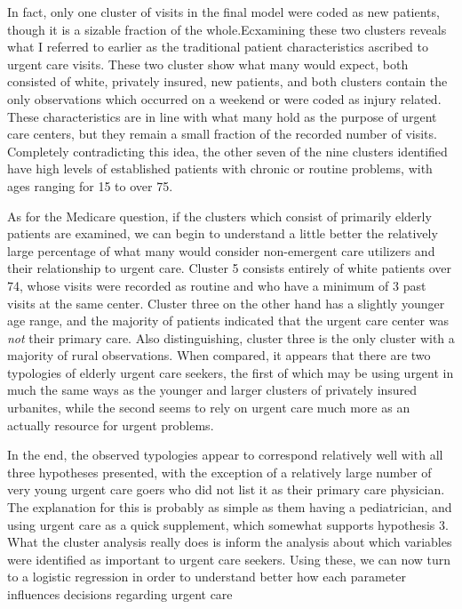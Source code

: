 \documentclass[12pt,twoside]{reedthesis}
\begin{document}
  In fact, only one cluster of visits in the final model were coded as new
  patients, though it is a sizable fraction of the whole.Ecxamining these
  two clusters reveals what I referred to earlier as the traditional
  patient characteristics ascribed to urgent care visits. These two
  cluster show what many would expect, both consisted of white, privately
  insured, new patients, and both clusters contain the only observations
  which occurred on a weekend or were coded as injury related. These
  characteristics are in line with what many hold as the purpose of urgent
  care centers, but they remain a small fraction of the recorded number of
  visits. Completely contradicting this idea, the other seven of the nine
  clusters identified have high levels of established patients with
  chronic or routine problems, with ages ranging for 15 to over 75.
  
  As for the Medicare question, if the clusters which consist of primarily
  elderly patients are examined, we can begin to understand a little
  better the relatively large percentage of what many would consider
  non-emergent care utilizers and their relationship to urgent care.
  Cluster 5 consists entirely of white patients over 74, whose visits were
  recorded as routine and who have a minimum of 3 past visits at the same
  center. Cluster three on the other hand has a slightly younger age
  range, and the majority of patients indicated that the urgent care
  center was \emph{not} their primary care. Also distinguishing, cluster
  three is the only cluster with a majority of rural observations. When
  compared, it appears that there are two typologies of elderly urgent
  care seekers, the first of which may be using urgent in much the same
  ways as the younger and larger clusters of privately insured urbanites,
  while the second seems to rely on urgent care much more as an actually
  resource for urgent problems.
  
  In the end, the observed typologies appear to correspond relatively well
  with all three hypotheses presented, with the exception of a relatively
  large number of very young urgent care goers who did not list it as
  their primary care physician. The explanation for this is probably as
  simple as them having a pediatrician, and using urgent care as a quick
  supplement, which somewhat supports hypothesis 3. What the cluster
  analysis really does is inform the analysis about which variables were
  identified as important to urgent care seekers. Using these, we can now
  turn to a logistic regression in order to understand better how each
  parameter influences decisions regarding urgent care
  
\end{document}
